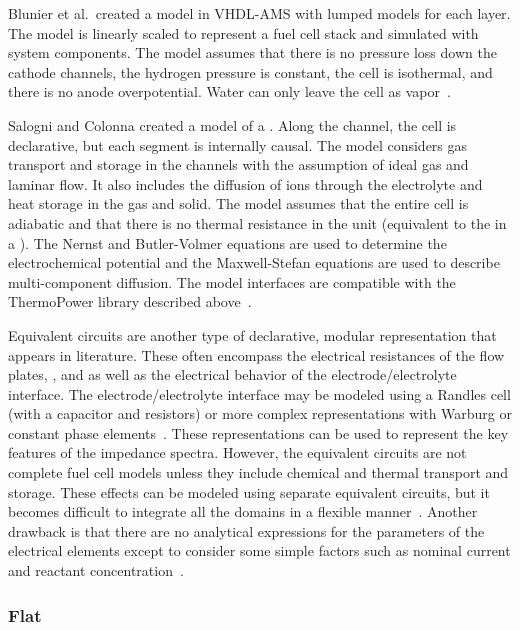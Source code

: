 Blunier et al.\ created a  model in VHDL-AMS with lumped models for each layer.  The model is linearly scaled to represent a fuel cell stack and simulated with system components.  The model assumes that there is no pressure loss down the cathode channels, the hydrogen pressure is constant, the cell is isothermal, and there is no anode overpotential.  Water can only leave the cell as vapor~\cite{Blunier2008, Gao2009}.

Salogni and Colonna created a  model of a .  Along the channel, the cell is declarative, but each segment is internally causal.  The model considers gas transport and storage in the channels with the assumption of ideal gas and laminar flow.  It also includes the diffusion of ions through the electrolyte and heat storage in the gas and solid.
The model assumes that the entire cell is adiabatic and that there is no thermal resistance in the  unit (equivalent to the  in a ).  The Nernst and Butler-Volmer equations are used to determine the electrochemical potential and the Maxwell-Stefan equations are used to describe multi-component diffusion.  The model interfaces are compatible with the ThermoPower library described above~\cite{Salogni2010}.

Equivalent circuits are another type of declarative, modular representation that appears in  literature.  These often encompass the electrical resistances of the flow plates, , and  as well as the electrical behavior of the electrode\slash{}electrolyte interface.  The electrode\slash{}electrolyte interface may be modeled using a Randles cell (with a capacitor and resistors) or more complex representations with Warburg or constant phase elements~\cite{Yuan2009}.  These representations can be used to represent the key features of the impedance spectra.  However, the equivalent circuits are not complete fuel cell models unless they include chemical and thermal transport and storage.  These effects can be modeled using separate equivalent circuits, but it becomes difficult to integrate all the domains in a flexible manner~\cite{Blunier2008}.  Another drawback is that there are no analytical expressions for the parameters of the electrical elements except to consider some simple factors such as nominal current and reactant concentration~\cite{Franco2007}.


\subsubsection{Flat}

